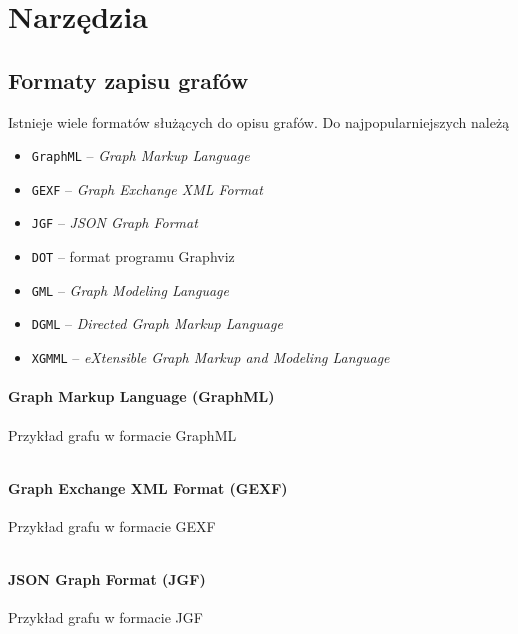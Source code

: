 \chapter{Narzędzia}
\section{Formaty zapisu grafów} \label{sec:graph-formats}
Istnieje wiele formatów służących do opisu grafów. Do najpopularniejszych należą \cite{bernard,gephi}

\begin{itemize}
\setlength\itemsep{0em}
\item \texttt{GraphML} -- \textit{Graph Markup Language}
\item \texttt{GEXF} -- \textit{Graph Exchange XML Format}
\item \texttt{JGF} -- \textit{JSON Graph Format}
\item \texttt{DOT} -- format programu Graphviz
\item \texttt{GML} -- \textit{Graph Modeling Language }
\item \texttt{DGML} -- \textit{Directed Graph Markup Language}
\item \texttt{XGMML} -- \textit{eXtensible Graph Markup and Modeling Language}
\end{itemize}

\subsubsection{Graph Markup Language (GraphML)}
\begin{listing}[H]
    \caption{Przykład grafu w formacie GraphML}
    \inputminted{xml}{example.graphml}
    \label{lst:graphml-example}
\end{listing}

\subsubsection{Graph Exchange XML Format (GEXF)}
\begin{listing}[H]
    \caption{Przykład grafu w formacie GEXF}
    \inputminted{xml}{example.gexf}
    \label{lst:gexf-example}
\end{listing}

\subsubsection{JSON Graph Format (JGF)} 
\begin{listing}[H]
    \caption{Przykład grafu w formacie JGF}
    \inputminted{json}{example.json}
    \label{lst:jgf-example}
\end{listing}

